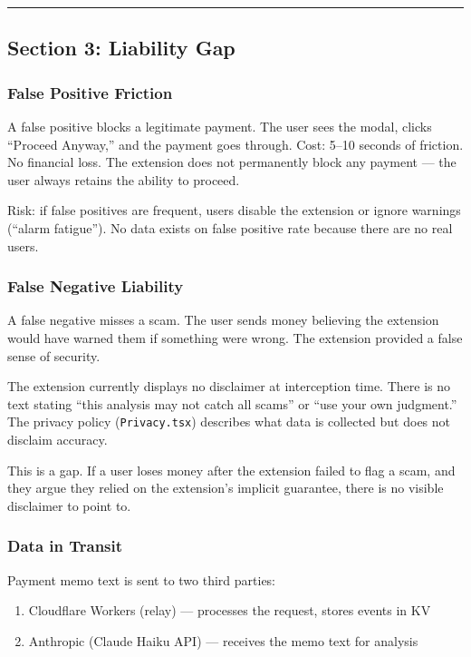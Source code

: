 \documentclass[11pt, letterpaper]{article}
\begin{document}
  \vspace{12pt}
  \hrule
  \vspace{12pt}

  \subsection{Section 3: Liability Gap}

  \subsubsection{False Positive Friction}

  A false positive blocks a legitimate payment. The user sees the modal, clicks ``Proceed Anyway,'' and the payment goes through. Cost: 5--10 seconds of friction. No financial loss. The extension does not permanently block any payment --- the user always retains the ability to proceed.

  Risk: if false positives are frequent, users disable the extension or ignore warnings (``alarm fatigue''). No data exists on false positive rate because there are no real users.

  \subsubsection{False Negative Liability}

  A false negative misses a scam. The user sends money believing the extension would have warned them if something were wrong. The extension provided a false sense of security.

  The extension currently displays no disclaimer at interception time. There is no text stating ``this analysis may not catch all scams'' or ``use your own judgment.'' The privacy policy (\texttt{Privacy.tsx}) describes what data is collected but does not disclaim accuracy.

  This is a gap. If a user loses money after the extension failed to flag a scam, and they argue they relied on the extension's implicit guarantee, there is no visible disclaimer to point to.

  \subsubsection{Data in Transit}

  Payment memo text is sent to two third parties:
  \begin{enumerate}[nosep]
    \item Cloudflare Workers (relay) --- processes the request, stores events in KV
    \item Anthropic (Claude Haiku API) --- receives the memo text for analysis
  \end{enumerate}
\end{document}
